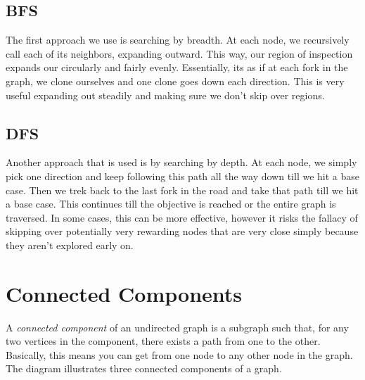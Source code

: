 \documentclass{article}
\begin{document}
\subsection{BFS}
The first approach we use is searching by breadth. At each node, we recursively call each of its neighbors, expanding outward. This way, our region of inspection expands our circularly and fairly evenly. Essentially, its as if at each fork in the graph, we clone ourselves and one clone goes down each direction. This is very useful expanding out steadily and making sure we don't skip over regions.

\subsection{DFS}
Another approach that is used is by searching by depth. At each node, we simply pick one direction and keep following this path all the way down till we hit a base case. Then we trek back to the last fork in the road and take that path till we hit a base case. This continues till the objective is reached or the entire graph is traversed. In some cases, this can be more effective, however it risks the fallacy of skipping over potentially very rewarding nodes that are very close simply because they aren't explored early on.

\section{Connected Components}

A \textit{connected component} of an undirected graph is a subgraph such that, for any two vertices in the component, there exists a path from one to the other. Basically, this means you can get from one node to any other node in the graph. The diagram illustrates three connected components of a graph.

\begin{center}
\end{center}
\end{document}
